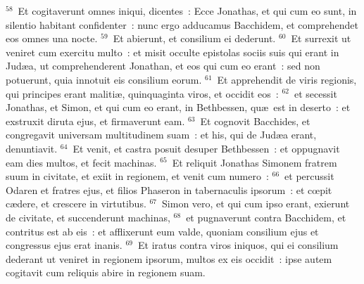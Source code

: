 ${}^{58}$~Et cogitaverunt omnes iniqui, dicentes~: Ecce Jonathas, et qui cum eo sunt, in silentio habitant confidenter~: nunc ergo adducamus Bacchidem, et comprehendet eos omnes una nocte.
${}^{59}$~Et abierunt, et consilium ei dederunt.
${}^{60}$~Et surrexit ut veniret cum exercitu multo~: et misit occulte epistolas sociis suis qui erant in Jud\ae a, ut comprehenderent Jonathan, et eos qui cum eo erant~: sed non potuerunt, quia innotuit eis consilium eorum.
${}^{61}$~Et apprehendit de viris regionis, qui principes erant maliti\ae , quinquaginta viros, et occidit eos~:
${}^{62}$~et secessit Jonathas, et Simon, et qui cum eo erant, in Bethbessen, qu\ae\ est in deserto~: et exstruxit diruta ejus, et firmaverunt eam.
${}^{63}$~Et cognovit Bacchides, et congregavit universam multitudinem suam~: et his, qui de Jud\ae a erant, denuntiavit.
${}^{64}$~Et venit, et castra posuit desuper Bethbessen~: et oppugnavit eam dies multos, et fecit machinas.
${}^{65}$~Et reliquit Jonathas Simonem fratrem suum in civitate, et exiit in regionem, et venit cum numero~:
${}^{66}$~et percussit Odaren et fratres ejus, et filios Phaseron in tabernaculis ipsorum~: et cœpit c\ae dere, et crescere in virtutibus.
${}^{67}$~Simon vero, et qui cum ipso erant, exierunt de civitate, et succenderunt machinas,
${}^{68}$~et pugnaverunt contra Bacchidem, et contritus est ab eis~: et afflixerunt eum valde, quoniam consilium ejus et congressus ejus erat inanis.
${}^{69}$~Et iratus contra viros iniquos, qui ei consilium dederant ut veniret in regionem ipsorum, multos ex eis occidit~: ipse autem cogitavit cum reliquis abire in regionem suam.


